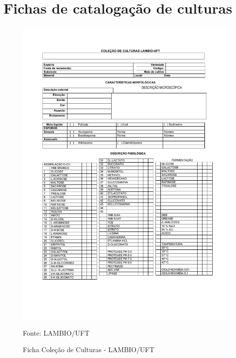 \documentclass[tcc2]{classe_uftex/uftex}
\begin{document}
\chapter{Fichas de catalogação de culturas}
\label{ape:fichas}

\begin{figure}[ht]
    \centering
      \includegraphics[scale=0.6]{TCC_Johnny/pdf/ficha_Culturas.pdf}
      \label{ape:ficha_culturas}
      \caption{Ficha Coleção de Culturas - LAMBIO/UFT}
       \raggedright \scriptsize \centering  Fonte: LAMBIO/UFT
    \end{figure}%
\end{document}
